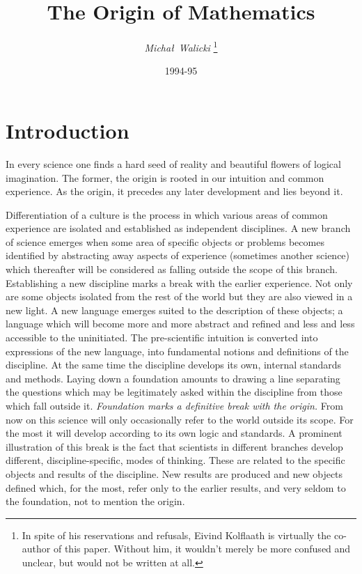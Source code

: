 

\title{The Origin of Mathematics}
\author{\small{\em Micha{\l}\ Walicki}
\thanks{In spite of his reservations and refusals, Eivind Kolflaath is virtually the
co-author of this paper. Without him, it wouldn't merely be more confused and unclear,
but would not be written at all.}}

\date{\hfill\small 1994-95}
\maketitle


\section{Introduction}
In every science one finds a hard seed of reality and beautiful flowers of 
logical imagination. The former, the origin is rooted in our intuition and 
common experience. As the origin, it precedes any later development and lies 
beyond it.

Differentiation of a culture is the process in which various areas of common experience are isolated and established as independent disciplines.
A new branch of science emerges when some area of specific objects or problems
 becomes identified by abstracting away aspects of experience (sometimes 
another science) which thereafter will be considered as falling outside the 
scope of this branch.
Establishing a new discipline marks a break with the earlier experience. 
Not only are some objects isolated from the rest of the world but they are 
also viewed in a new light. A new language emerges suited to the description 
of these objects; a language which will become more and more abstract and 
refined and less and less accessible to the uninitiated. The pre-scientific 
intuition is converted into expressions of the new language, into fundamental 
notions and definitions of the discipline. At the same time the discipline 
develops its own, internal standards and methods. Laying down a foundation 
amounts to drawing a line separating the questions which may be legitimately 
asked within the discipline from those which fall outside it. {\em Foundation marks
 a definitive break with the origin.} From now on this science will only 
occasionally refer to the world outside its scope. For the most it will 
develop according to its own logic and standards. A prominent illustration of
 this break is the fact that scientists in different branches develop 
different, discipline-specific, modes of thinking. These are related to the 
specific objects and results of the discipline. New results are produced and 
new objects defined which, for the most, refer only to the earlier results, 
and very seldom to the foundation, not to mention the origin. 

